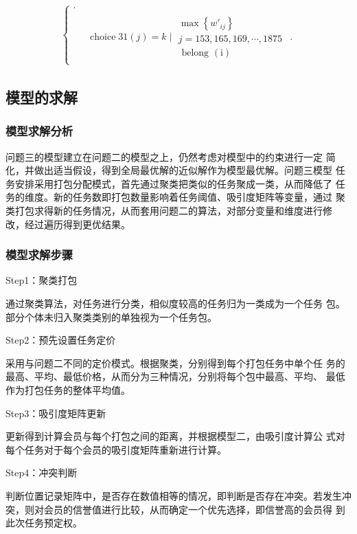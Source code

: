 $$\begin{aligned}
\begin{cases}
       .                                                                \\
        & \begin{array}{l}
           \operatorname{choice} 31(j)=k\mid \begin{array}{l}
               \max \left\{{w'}_{i j}\right\} \\
               j=153,165,169, \cdots, 1875 \\
               \text { belong }(\mathrm{i})
           \end{array}
       \end{array}.
   \end{cases}
\end{aligned}
$$
\subsection{模型的求解}
\subsubsection{模型求解分析}
问题三的模型建立在问题二的模型之上，仍然考虑对模型中的约束进行一定
简化，并做出适当假设，得到全局最优解的近似解作为模型最优解。问题三模型
任务安排采用打包分配模式，首先通过聚类把类似的任务聚成一类，从而降低了
任务的维度。新的任务数即打包数量影响着任务阈值、吸引度矩阵等变量，通过
聚类打包求得新的任务情况，从而套用问题二的算法，对部分变量和维度进行修
改，经过遍历得到更优结果。
\subsubsection{模型求解步骤}
Step1：聚类打包

通过聚类算法，对任务进行分类，相似度较高的任务归为一类成为一个任务
包。部分个体未归入聚类类别的单独视为一个任务包。

Step2：预先设置任务定价

采用与问题二不同的定价模式。根据聚类，分别得到每个打包任务中单个任
务的最高、平均、最低价格，从而分为三种情况，分别将每个包中最高、平均、
最低作为打包任务的整体平均值。

Step3：吸引度矩阵更新

更新得到计算会员与每个打包之间的距离，并根据模型二，由吸引度计算公
式对每个任务对于每个会员的吸引度矩阵重新进行计算。

Step4：冲突判断

判断位置记录矩阵中，是否存在数值相等的情况，即判断是否存在冲突。若发生冲突，则对会员的信誉值进行比较，从而确定一个优先选择，即信誉高的会员得
到此次任务预定权。

